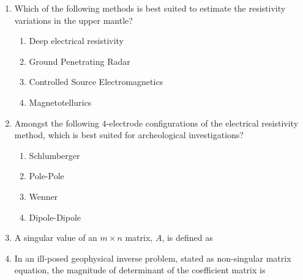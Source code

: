 \documentclass[journal,12pt,onecolumn]{IEEEtran}
\theoremstyle{remark}
\begin{document}
\begin{enumerate}[start = 26 ]
        \item Which of the following methods is best suited to estimate the resistivity variations in the upper mantle? \hfill{}
            \begin{enumerate}
                    \item Deep electrical resistivity
                    \item Ground Penetrating Radar
                    \item Controlled Source Electromagnetics
                    \item Magnetotellurics
            \end{enumerate}

        \item Amongst the following $4$-electrode configurations of the electrical resistivity method, which is best suited for archeological investigations? \hfill{}
            \begin{enumerate}
                    \item Schlumberger
                    \item Pole-Pole
                    \item Wenner
                    \item Dipole-Dipole
            \end{enumerate}

        \item A singular value of an $m \times n$ matrix, $A$, is defined as \hfill{}
            \begin{enumerate}
            \end{enumerate}

        \item In an ill-posed geophysical inverse problem, stated as non-singular matrix equation, the magnitude of determinant of the coefficient matrix is \hfill{}
            \begin{enumerate}
            \end{enumerate}


\end{enumerate}
\end{document}
